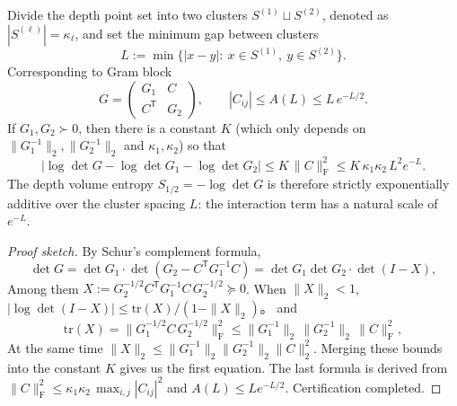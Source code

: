 \begin{proposition}\label{prop:xi-hellinger-gram-cluster-additivity-exp}
Divide the depth point set into two clusters \(S^{(1)}\sqcup S^{(2)}\), denoted as \(|S^{(\ell)}|=\kappa_\ell\), and set the minimum gap between clusters
\[
L:=\min\{|x-y|:\ x\in S^{(1)},\ y\in S^{(2)}\}.
\]
Corresponding to Gram block
\[
G=\begin{pmatrix}G_1 & C\\ C^{\mathsf T}& G_2\end{pmatrix},
\qquad
|C_{ij}|\le A(L)\le L\,e^{-L/2}.
\]
If \(G_1,G_2\succ0\), then there is a constant \(K\) (which only depends on \(\|G_1^{-1}\|_2,\|G_2^{-1}\|_2\) and \(\kappa_1,\kappa_2\)) so that
\[
\bigl|\log\det G-\log\det G_1-\log\det G_2\bigr|
\le K\,\|C\|_{\mathrm F}^{2}
\le K\,\kappa_1\kappa_2\,L^{2}e^{-L}.
\]
The depth volume entropy \(S_{1/2}=-\log\det G\) is therefore strictly exponentially additive over the cluster spacing \(L\): the interaction term has a natural scale of \(e^{-L}\).
\end{proposition}
\begin{proof}[Proof sketch]
By Schur’s complement formula,
\[
\det G=\det G_1\cdot \det(G_2-C^{\mathsf T}G_1^{-1}C)
=\det G_1\det G_2\cdot \det(I-X),
\]
Among them \(X:=G_2^{-1/2}C^{\mathsf T}G_1^{-1}C\,G_2^{-1/2}\succeq 0\).
When \(\|X\|_2<1\),
\(
|\log\det(I-X)|\le \mathrm{tr}(X)/(1-\|X\|_2)
\)。
and
\[
\mathrm{tr}(X)=\|G_1^{-1/2}C\,G_2^{-1/2}\|_{\mathrm F}^2
\le \|G_1^{-1}\|_2\,\|G_2^{-1}\|_2\,\|C\|_{\mathrm F}^2,
\]
At the same time \(\|X\|_2\le \|G_1^{-1}\|_2\|G_2^{-1}\|_2\|C\|_2^2\).
Merging these bounds into the constant \(K\) gives us the first equation.
The last formula is derived from \(\|C\|_{\mathrm F}^2\le \kappa_1\kappa_2\,\max_{i,j}|C_{ij}|^2\) and \(A(L)\le L e^{-L/2}\). Certification completed.
\end{proof}

